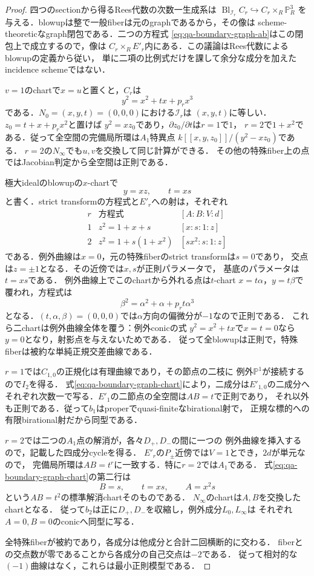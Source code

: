\begin{proof}
四つのsectionから得るRees代数の次数一生成系は
$\operatorname{Bl}_{\mathcal I_r}C_r\hookrightarrow C_r\times_R\mathbb P^3_R$
を与える．blowupは整で一般fiberは元のgraphであるから，その像は
scheme-theoreticなgraph閉包である．二つの方程式
\eqref{eq:qa-boundary-graph-ab}はこの閉包上で成立するので，像は
$C_r\times_R E'_r$内にある．この議論はRees代数によるblowupの定義\cite[Lemmas 31.33.2--31.33.3]{StacksBlowups}から従い，
単に二項の比例式だけを課して余分な成分を加えたincidence schemeではない．

$v=1$のchartで$x=u$と置くと，$C_r$は
\[
 y^2=x^2+tx+p_rx^3
\]
である．$N_0=(x,y,t)=(0,0,0)$における$\mathcal I_r$は
$(x,y,t)$に等しい．$z_0=t+x+p_rx^2$と置けば
$y^2=xz_0$であり，$\partial z_0/\partial t$は$r=1$で$1$，
$r=2$で$1+x^2$である．従って全空間の完備局所環は$A_1$特異点
$k[[x,y,z_0]]/(y^2-xz_0)$である．
$r=2$の$N_\infty$でも$u,v$を交換して同じ計算ができる．
その他の特殊fiber上の点ではJacobian判定から全空間は正則である．

極大idealのblowupの$x$-chartで
\[
 y=xz,\qquad t=xs
\]
と書く．strict transformの方程式と$E'_r$への射は，それぞれ
\[
 \begin{array}{c|c|c}
 r&\text{方程式}&[A:B:V:d]\\\hline
 1&z^2=1+x+s&[x:s:1:z]\\
 2&z^2=1+s(1+x^2)&[sx^2:s:1:z]
 \end{array}
 \tag{G-chart}\label{eq:qa-boundary-graph-chart}
\]
である．例外曲線は$x=0$，元の特殊fiberのstrict transformは$s=0$であり，
交点は$z=\pm1$となる．その近傍では$x,s$が正則パラメータで，
基底のパラメータは$t=xs$である．
例外曲線上でこのchartから外れる点は$t$-chart
$x=t\alpha$，$y=t\beta$で覆われ，方程式は
\[
 \beta^2=\alpha^2+\alpha+p_rt\alpha^3
\]
となる．$(t,\alpha,\beta)=(0,0,0)$では$\alpha$方向の偏微分が$-1$なので正則である．
これら二chartは例外曲線全体を覆う：例外conicの式
$y^2=x^2+tx$で$x=t=0$なら$y=0$となり，射影点を与えないためである．
従って全blowupは正則で，特殊fiberは被約な単純正規交差曲線である．

$r=1$では$C_{1,0}$の正規化は有理曲線であり，その節点の二枝に
例外$\mathbb P^1$が接続するので$I_2$を得る．
式\eqref{eq:qa-boundary-graph-chart}により，二成分は$E'_{1,0}$の二成分へ
それぞれ次数一で写る．$E'_1$の二節点の全空間は$AB=t$で正則であり，
それ以外も正則である．従って$b_1$はproperでquasi-finiteなbirational射で，
正規な標的への有限birational射だから同型である．

$r=2$では二つの$A_1$点の解消が，各々$D_+,D_-$の間に一つの
例外曲線を挿入するので，記載した四成分cycleを得る．
$E'_r$の$P_\pm$近傍では$V=1$とでき，$2d$が単元なので，
完備局所環は$AB=t^r$に一致する．特に$r=2$では$A_1$である．
式\eqref{eq:qa-boundary-graph-chart}の第二行は
\[
 B=s,\qquad t=xs,\qquad A=x^2s
\]
という$AB=t^2$の標準解消chartそのものである．
$N_\infty$のchartは$A,B$を交換したchartとなる．
従って$b_2$は正に$D_+,D_-$を収縮し，例外成分$L_0,L_\infty$は
それぞれ$A=0,B=0$のconicへ同型に写る．

全特殊fiberが被約であり，各成分は他成分と合計二回横断的に交わる．
fiberとの交点数が零であることから各成分の自己交点は$-2$である．
従って相対的な$(-1)$曲線はなく，これらは最小正則模型である．
\end{proof}

